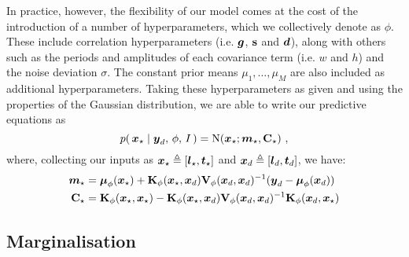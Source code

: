 \documentclass{acmtrans2m}
\begin{document}
In practice, however, the flexibility of our model comes at the cost of the introduction of a number of hyperparameters, which we collectively denote as $\phi$. These include correlation hyperparameters (i.e. $\boldsymbol{g}$, $\mathbf{s}$ and $\boldsymbol{d}$), along with others such as the periods and amplitudes of each covariance term (i.e. $w$ and $h$) and the noise deviation $\sigma$. The constant prior means $\mu_1,\ldots,\mu_M$ are also included as additional hyperparameters. Taking these hyperparameters as given and using the properties of the Gaussian distribution, we are able to write our predictive equations as
\begin{equation} \label{eq:GPMeanVar}
p\!\left(\,\boldsymbol{x}_\star\mid\boldsymbol{y}_d,\,\phi,\,I\,\right)=\text{N}\!\left(\boldsymbol{x}_\star;\boldsymbol{m}_\star,\mathbf{C}_\star\right)\,,
\end{equation}
where, collecting our inputs as $\boldsymbol{x}_\star\triangleq[\boldsymbol{l}_\star,\boldsymbol{t}_\star]$ and $\boldsymbol{x}_d\triangleq[\boldsymbol{l}_d,\boldsymbol{t}_d]$, we have:
\begin{align} 
\boldsymbol{m}_\star&=\boldsymbol{\mu}_\phi(\boldsymbol{x}_\star)+\mathbf{K}_\phi(\boldsymbol{x}_\star,\boldsymbol{x}_d)\mathbf{V}_\phi(\boldsymbol{x}_d,\boldsymbol{x}_d)^{-1}(\boldsymbol{y}_d-\boldsymbol{\mu}_\phi(\boldsymbol{x}_d))\label{eq:GPMean}\\
\mathbf{C}_\star&=\mathbf{K}_\phi(\boldsymbol{x}_\star,\boldsymbol{x}_\star)-\mathbf{K}_\phi(\boldsymbol{x}_\star,\boldsymbol{x}_d)\mathbf{V}_\phi(\boldsymbol{x}_d,\boldsymbol{x}_d)^{-1}\mathbf{K}_\phi(\boldsymbol{x}_d,\boldsymbol{x}_\star)\label{eq:GPVar}
\end{align}

\subsection{Marginalisation}
\end{document}
